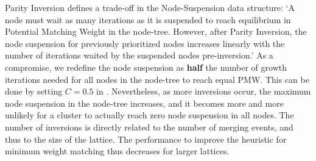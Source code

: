 Parity Inversion defines a trade-off in the Node-Suspension data structure: `A node must wait as many iterations as it is suspended to reach equilibrium in Potential Matching Weight in the node-tree. However, after Parity Inversion, the node suspension for previously prioritized nodes increases linearly with the number of iterations waited by the suspended nodes pre-inversion.' As a compromise, we redefine the node suspension as \textbf{half} the number of growth iterations needed for all nodes in the node-tree to reach equal PMW. This can be done by setting $C=0.5$ in . Nevertheless, as more inversions occur, the maximum node suspension in the node-tree increases, and it becomes more and more unlikely for a cluster to actually reach zero node suspension in all nodes. The number of inversions is directly related to the number of merging events, and thus to the size of the lattice. The performance to improve the heuristic for minimum weight matching thus decreases for larger lattices. 

